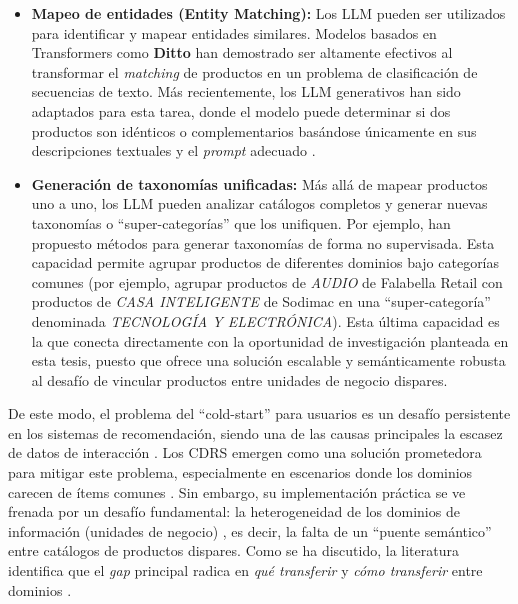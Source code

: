 		\begin{itemize}
			\item \textbf{Mapeo de entidades (Entity Matching):} Los LLM pueden ser utilizados para identificar y mapear entidades similares. Modelos basados en Transformers como \textbf{Ditto} \cite{1360021396355430528} han demostrado ser altamente efectivos al transformar el \textit{matching} de productos en un problema de clasificación de secuencias de texto. Más recientemente, los LLM generativos han sido adaptados para esta tarea, donde el modelo puede determinar si dos productos son idénticos o complementarios basándose únicamente en sus descripciones textuales y el \textit{prompt} adecuado \cite{peeters2024entitymatchingusinglarge}.
			\item \textbf{Generación de taxonomías unificadas:} Más allá de mapear productos uno a uno, los LLM pueden analizar catálogos completos y generar nuevas taxonomías o \enquote{super-categorías} que los unifiquen. Por ejemplo, \cite{10.1145/3219819.3220064} han propuesto métodos para generar taxonomías de forma no supervisada. Esta capacidad permite agrupar productos de diferentes dominios bajo categorías comunes (por ejemplo, agrupar productos de \textit{AUDIO} de Falabella Retail con productos de \textit{CASA INTELIGENTE} de Sodimac en una \enquote{super-categoría} denominada \textit{TECNOLOGÍA Y ELECTRÓNICA}). Esta última capacidad es la que conecta directamente con la oportunidad de investigación planteada en esta tesis, puesto que ofrece una solución escalable y semánticamente robusta al desafío de vincular productos entre unidades de negocio dispares.
		\end{itemize}

De este modo, el problema del \enquote{cold-start} para usuarios es un desafío persistente en los sistemas de recomendación, siendo una de las causas principales la escasez de datos de interacción \cite{10339320}. Los CDRS emergen como una solución prometedora para mitigar este problema, especialmente en escenarios donde los dominios carecen de ítems comunes \cite{10.1145/3548455}. Sin embargo, su implementación práctica se ve frenada por un desafío fundamental: la heterogeneidad de los dominios de información (unidades de negocio) \cite{9732900}, es decir, la falta de un \enquote{puente semántico} entre catálogos de productos dispares. Como se ha discutido, la literatura identifica que el \textit{gap} principal radica en \textit{qué transferir} y \textit{cómo transferir} entre dominios \cite{10.1145/3548455}.

